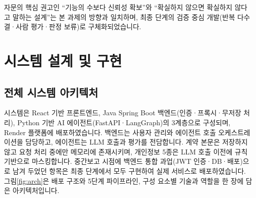 \documentclass[10pt,a4paper]{article}
\begin{document}
자문의 핵심 권고인 ``기능의 수보다 신뢰성 확보''와 ``확실하지 않으면 확실하지 않다고 말하는 설계''는 본 과제의 방향과 일치하며, 최종 단계의 검증 중심 개발(반복 다수결·사람 평가·판정 보류)로 구체화되었습니다.

\section{시스템 설계 및 구현}

\subsection{전체 시스템 아키텍처}
시스템은 React 기반 프론트엔드, Java Spring Boot 백엔드(인증·프록시·무저장 처리), Python 기반 AI 에이전트(FastAPI·LangGraph)의 3계층으로 구성되며, Render 플랫폼에 배포하였습니다. 백엔드는 사용자 관리와 에이전트 호출 오케스트레이션을 담당하고, 에이전트는 LLM 호출과 평가를 전담합니다. 계약 본문은 저장하지 않고 요청 처리 중에만 메모리에 존재시키며, 개인정보 5종은 LLM 호출 이전에 규칙 기반으로 마스킹합니다. 중간보고 시점에 백엔드 통합 과업(JWT 인증·DB·배포)으로 남겨 두었던 항목은 최종 단계에서 모두 구현하여 실제 서비스로 배포하였습니다. 그림\ref{fig:arch}은 배포 구조와 5단계 파이프라인, 구성 요소별 기술과 역할을 한 장에 담은 아키텍처입니다.
\end{document}
